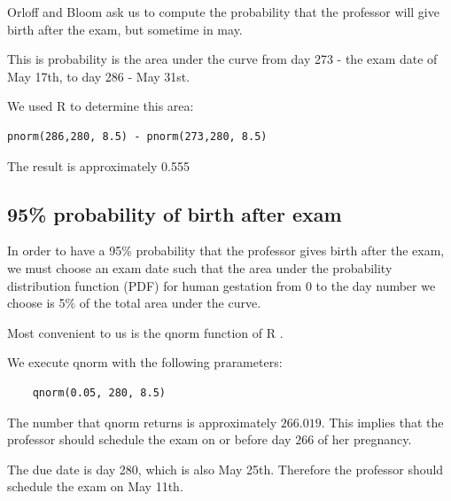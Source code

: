 \documentclass[a4paper,11pt]{article}
\begin{document}
Orloff and Bloom ask us to compute the probability that the professor will give birth after the exam, but sometime in may.

This is probability is the area under the curve from day 273
 - the exam date of May 17th, to
day 286 - May 31st.

We used R to determine this area:

\begin{lstlisting}
pnorm(286,280, 8.5) - pnorm(273,280, 8.5)
\end{lstlisting}

The result is approximately 0.555

\subsection{95\% probability of birth after exam}

In order to have a 95\% probability that the professor gives birth after the
exam, we must choose an exam date such that the area under the probability
distribution function (PDF) for human gestation from 0 to the day number
we choose is 5\% of the total area under the curve.

Most convenient to us is the qnorm function of R \cite{studio3}.

We execute qnorm with the following prarameters:
\begin{lstlisting}
	qnorm(0.05, 280, 8.5)
\end{lstlisting}

The number that qnorm returns is approximately $266.019$.  This implies
that the professor should schedule the exam on or before day $266$ of
her pregnancy.

The due date is day 280, which is also May 25th. Therefore the professor should
schedule the exam on May 11th.
\printbibliography{}
\end{document}
